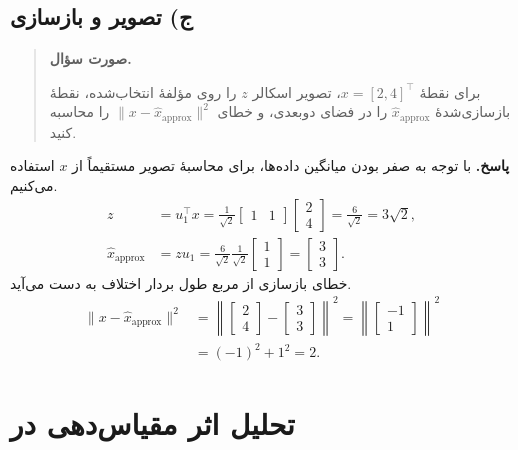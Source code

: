\documentclass{article}
\numberwithin{equation}{section}
\numberwithin{table}{section}
\newenvironment{questionprompt}{%
    \begin{quote}\noindent\textbf{صورت سؤال.}\enspace\ignorespaces
}{%
    \end{quote}\noindent\textbf{پاسخ.}\enspace\ignorespacesafterend
}
\begin{document}
\subsection*{ج) تصویر و بازسازی}
\begin{questionprompt}
    برای نقطهٔ \(x=[2,4]^\top\)، تصویر اسکالر \(z\) را روی مؤلفهٔ انتخاب‌شده، نقطهٔ بازسازی‌شدهٔ \(\hat{x}_{\mathrm{approx}}\) را در فضای دوبعدی، و خطای \(\lVert x-\hat{x}_{\mathrm{approx}}\rVert^2\) را محاسبه کنید.
\end{questionprompt}
با توجه به صفر بودن میانگین داده‌ها، برای محاسبهٔ تصویر مستقیماً از \(x\) استفاده می‌کنیم.
\begin{align*}
    z
    &=u_1^\top x
      =\frac{1}{\sqrt{2}}\begin{bmatrix}1&1\end{bmatrix}
        \begin{bmatrix}2\\4\end{bmatrix}
      =\frac{6}{\sqrt{2}}=3\sqrt{2},\\
    \hat{x}_{\mathrm{approx}}
    &=zu_1
      =\frac{6}{\sqrt{2}}\frac{1}{\sqrt{2}}\begin{bmatrix}1\\1\end{bmatrix}
      =\begin{bmatrix}3\\3\end{bmatrix}.
\end{align*}
خطای بازسازی از مربع طول بردار اختلاف به دست می‌آید.
\begin{align*}
    \lVert x-\hat{x}_{\mathrm{approx}}\rVert^2
    &=\left\lVert
       \begin{bmatrix}2\\4\end{bmatrix}
       -\begin{bmatrix}3\\3\end{bmatrix}
       \right\rVert^2
      =\left\lVert\begin{bmatrix}-1\\1\end{bmatrix}\right\rVert^2\\
    &=(-1)^2+1^2=2.
\end{align*}

\section{تحلیل اثر مقیاس‌دهی در }
\end{document}
